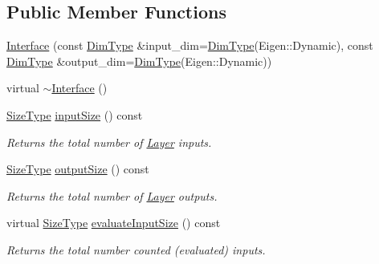 \subsection*{Public Member Functions}
\begin{DoxyCompactItemize}
\item 
\hyperlink{classffnn_1_1layer_1_1internal_1_1_interface_aa99ab267db32eb48f2a3f9a2b76a2412}{Interface} (const \hyperlink{classffnn_1_1layer_1_1internal_1_1_interface_a8d121d0103f254b51e48f7b20a17681f}{Dim\-Type} \&input\-\_\-dim=\hyperlink{classffnn_1_1layer_1_1internal_1_1_interface_a8d121d0103f254b51e48f7b20a17681f}{Dim\-Type}(Eigen\-::\-Dynamic), const \hyperlink{classffnn_1_1layer_1_1internal_1_1_interface_a8d121d0103f254b51e48f7b20a17681f}{Dim\-Type} \&output\-\_\-dim=\hyperlink{classffnn_1_1layer_1_1internal_1_1_interface_a8d121d0103f254b51e48f7b20a17681f}{Dim\-Type}(Eigen\-::\-Dynamic))
\item 
virtual \hyperlink{classffnn_1_1layer_1_1internal_1_1_interface_a87499fd55b6612a35a1af5b13b851a55}{$\sim$\-Interface} ()
\item 
\hyperlink{classffnn_1_1layer_1_1internal_1_1_interface_af0567642f60c65b5e87067226a54174b}{Size\-Type} \hyperlink{classffnn_1_1layer_1_1internal_1_1_interface_a6de2e5a7e17c266f52d695ccf8e0b379}{input\-Size} () const 
\begin{DoxyCompactList}\small\item\em Returns the total number of \hyperlink{classffnn_1_1layer_1_1_layer}{Layer} inputs. \end{DoxyCompactList}\item 
\hyperlink{classffnn_1_1layer_1_1internal_1_1_interface_af0567642f60c65b5e87067226a54174b}{Size\-Type} \hyperlink{classffnn_1_1layer_1_1internal_1_1_interface_a3578b4137e24bd8992cdc8dd6def0745}{output\-Size} () const 
\begin{DoxyCompactList}\small\item\em Returns the total number of \hyperlink{classffnn_1_1layer_1_1_layer}{Layer} outputs. \end{DoxyCompactList}\item 
virtual \hyperlink{classffnn_1_1layer_1_1internal_1_1_interface_af0567642f60c65b5e87067226a54174b}{Size\-Type} \hyperlink{classffnn_1_1layer_1_1internal_1_1_interface_aae590ebe90408887805743c5e364dd45}{evaluate\-Input\-Size} () const 
\begin{DoxyCompactList}\small\item\em Returns the total number counted (evaluated) inputs. \end{DoxyCompactList}\item 

\end{DoxyCompactItemize}
